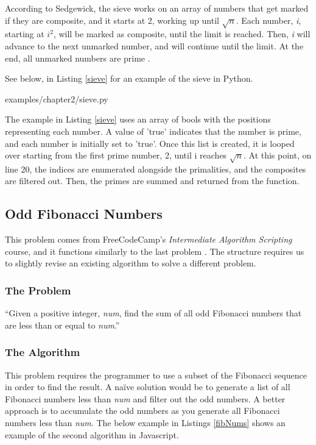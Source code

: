 \documentclass[12pt, oneside, a4paper]{book}
\begin{document}
         According to Sedgewick, the sieve works on an array of numbers that get marked if they are composite, and it starts at 2, working up until $\sqrt{n}$.
         Each number, \textit{i}, starting at \textit{$i^2$}, will be marked as composite, until the limit is reached.
         Then, \textit{i} will advance to the next unmarked number, and will continue until the limit.
         At the end, all unmarked numbers are prime \autocite{sedgewickAlgorithms1992}.

         See below, in Listing \ref{sieve} for an example of the sieve in Python.
         
         {examples/chapter2/sieve.py}

         The example in Listing \ref{sieve} uses an array of bools with the positions representing each number.
         A value of 'true' indicates that the number is prime, and each number is initially set to 'true'.
         Once this list is created, it is looped over starting from the first prime number, 2, until i reaches $\sqrt{n}$.
         At this point, on line 20, the indices are enumerated alongside the primalities, and the composites are filtered out.
         Then, the primes are summed and returned from the function.

         \subsection{Odd Fibonacci Numbers}
         This problem comes from FreeCodeCamp's \textit{Intermediate Algorithm Scripting} course, and it functions similarly to the last problem \autocite{freecodecampLearnIntermediateAlgorithm}.
         The structure requires us to slightly revise an existing algorithm to solve a different problem.

         \subsubsection{The Problem}
         ``Given a positive integer, \textit{num}, find the sum of all odd Fibonacci numbers that are less than or equal to \textit{num}.''

         \subsubsection{The Algorithm}
         This problem requires the programmer to use a subset of the Fibonacci sequence in order to find the result.
         A naïve solution would be to generate a list of all Fibonacci numbers less than \textit{num} and filter out the odd numbers.
         A better approach is to accumulate the odd numbers as you generate all Fibonacci numbers less than \textit{num}.
         The below example in Listings \ref{fibNums} shows an example of the second algorithm in Javascript.
\end{document}

